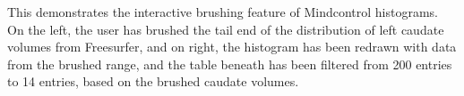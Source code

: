 \label{fig:brush}
This demonstrates the interactive brushing feature of Mindcontrol histograms. On the left, the user has brushed the tail end of the distribution of left caudate volumes from Freesurfer, and on right, the histogram has been redrawn with data from the brushed range, and the table beneath has been filtered from 200 entries to 14 entries, based on the brushed caudate volumes.